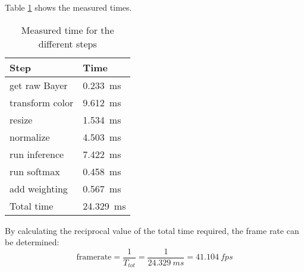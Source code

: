 Table \ref{tab:measured_times} shows the measured times.

\begin{table}[hb]
	\caption{Measured time for the different steps}
	\label{tab:measured_times}
	\centering
	\begin{tabular}{ll}
		\toprule
		\textbf{Step} & \textbf{Time} \\
		\midrule
		get raw Bayer & \SI{0.233}{ms} \\
		transform color & \SI{9.612}{ms} \\
		resize & \SI{1.534}{ms} \\
		normalize & \SI{4.503}{ms} \\
		run inference & \SI{7.422}{ms} \\
		run softmax & \SI{0.458}{ms} \\
		add weighting & \SI{0.567}{ms} \\
		\midrule
		Total time & \SI{24.329}{ms} \\
		\bottomrule
	\end{tabular}
\end{table}

By calculating the reciprocal value of the total time required, the frame rate can be determined:
\begin{equation}
  \text{framerate} = \frac{1}{T_{tot}} = \frac{1}{\SI{24.329}{ms}} = \SI{41.104}{fps}
  \label{eq:achieved_framerate}
\end{equation}
